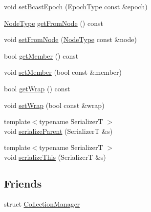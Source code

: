 \begin{DoxyCompactItemize}
\item 
void \hyperlink{structvt_1_1vrt_1_1collection_1_1_collection_message_a513a81678ec43a110e39d957735831bd}{set\+Bcast\+Epoch} (\hyperlink{namespacevt_a985a5adf291c34a3ca263b3378388236}{Epoch\+Type} const \&epoch)
\item 
\hyperlink{namespacevt_a866da9d0efc19c0a1ce79e9e492f47e2}{Node\+Type} \hyperlink{structvt_1_1vrt_1_1collection_1_1_collection_message_a642d64890e3ef47a5561ceaede752181}{get\+From\+Node} () const
\item 
void \hyperlink{structvt_1_1vrt_1_1collection_1_1_collection_message_a5bd7fd9ea84e15d528e1546a98f4bd5e}{set\+From\+Node} (\hyperlink{namespacevt_a866da9d0efc19c0a1ce79e9e492f47e2}{Node\+Type} const \&node)
\item 
bool \hyperlink{structvt_1_1vrt_1_1collection_1_1_collection_message_a6e3627adc70baecfd59a095e70729fee}{get\+Member} () const
\item 
void \hyperlink{structvt_1_1vrt_1_1collection_1_1_collection_message_a7ab28aae693beb9ffea7eed409fe3ccf}{set\+Member} (bool const \&member)
\item 
bool \hyperlink{structvt_1_1vrt_1_1collection_1_1_collection_message_adb0f0904b4bd0646e51dc0a76c54d487}{get\+Wrap} () const
\item 
void \hyperlink{structvt_1_1vrt_1_1collection_1_1_collection_message_a0c5a8830f6079278d7df90d0b6fc07b5}{set\+Wrap} (bool const \&wrap)
\item 
{\footnotesize template$<$typename SerializerT $>$ }\\void \hyperlink{structvt_1_1vrt_1_1collection_1_1_collection_message_ac6fcdd9d918d5e60d22d92479f47bb92}{serialize\+Parent} (SerializerT \&s)
\item 
{\footnotesize template$<$typename SerializerT $>$ }\\void \hyperlink{structvt_1_1vrt_1_1collection_1_1_collection_message_ab2da30e2134676542fd4f4413c8eec58}{serialize\+This} (SerializerT \&s)
\end{DoxyCompactItemize}
\subsection*{Friends}
\begin{DoxyCompactItemize}
\item 
struct \hyperlink{structvt_1_1vrt_1_1collection_1_1_collection_message_af9288b1963f434a90b307b5305a49510}{Collection\+Manager}
\end{DoxyCompactItemize}


